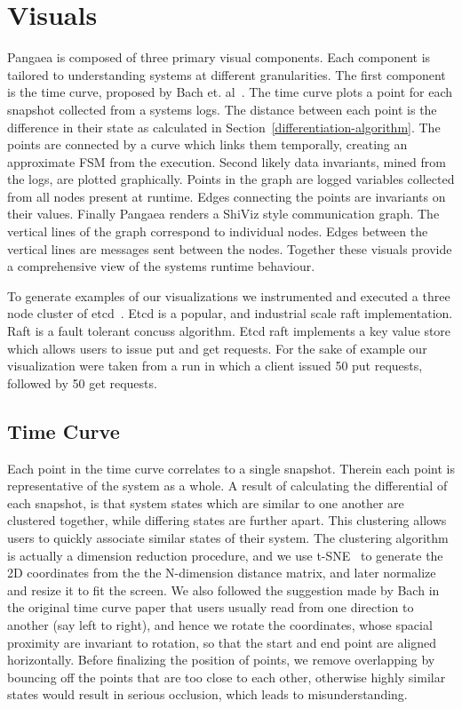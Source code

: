 \section{Visuals}
\label{sec:visuals}

Pangaea is composed of three primary visual components. Each component is
tailored to understanding systems at different granularities. The
first component is the time curve, proposed by Bach et. al~\cite{Bach2015timecurves}. 
The time curve plots a point for
each snapshot collected from a systems logs. The distance between each
point is the difference in their state as calculated in
Section~\ref{differentiation-algorithm}. The points are connected by a
curve which links them temporally, creating an approximate FSM from
the execution. Second likely data invariants, mined from the logs, are
plotted graphically. Points in the graph are logged variables collected
from all nodes present at runtime. Edges connecting the points are
invariants on their values. Finally Pangaea renders a ShiViz style
communication graph. The vertical lines of the graph correspond to
individual nodes. Edges between the vertical lines are messages sent
between the nodes. Together these visuals provide a comprehensive view
of the systems runtime behaviour.

To generate examples of our visualizations we instrumented and
executed a three node cluster of etcd~\cite{etcdraft}. Etcd is a
popular, and industrial scale raft implementation. Raft is a fault
tolerant concuss algorithm. Etcd raft implements a key value store
which allows users to issue put and get requests. For the sake of
example our visualization were taken from a run in which a client
issued 50 put requests, followed by 50 get requests.

\subsection{Time Curve}
\label{sec:time-curve}


Each point in the time curve correlates to a single snapshot.  Therein
each point is representative of the system as a whole.  A result of
calculating the differential of each snapshot, is that system states
which are similar to one another are clustered together, while
differing states are further apart.  This clustering allows users to
quickly associate similar states of their system. 
The clustering algorithm is actually a dimension reduction procedure,
and we use t-SNE~\cite{maaten2008visualizing} to generate the 2D 
coordinates from the the N-dimension distance matrix, and later 
normalize and resize it to fit the screen.  We also followed the 
suggestion made by Bach in the original time curve paper that 
users usually read from one direction to another (say left to right),
and hence we rotate the coordinates, whose spacial proximity
are invariant to rotation, so that the start and end point are
aligned horizontally.  Before finalizing the position of points,
we remove overlapping by bouncing off the points that are too close
to each other, otherwise highly similar states would result in
serious occlusion, which leads to misunderstanding.


